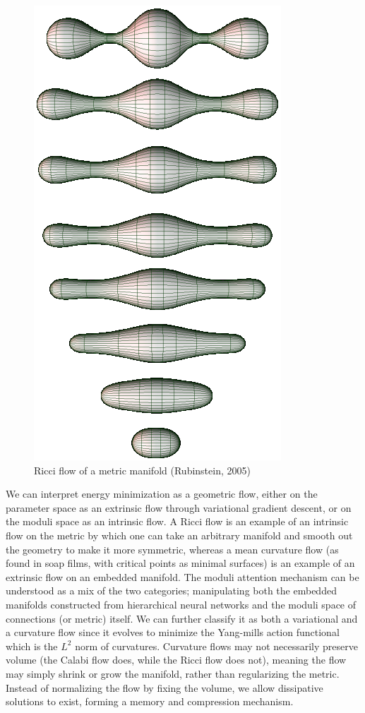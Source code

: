 \documentclass{article}
\begin{document}
    \begin{figure}
        \vspace{0.3cm}
        \centering
        \includegraphics[scale=0.3]{ricci-flow.png}
        \\ Ricci flow of a metric manifold (Rubinstein, 2005)
    \end{figure}
    
    We can interpret energy minimization as a geometric flow, either on the parameter space as an extrinsic flow through variational gradient descent, or on the moduli space as an intrinsic flow. A Ricci flow is an example of an intrinsic flow on the metric by which one can take an arbitrary manifold and smooth out the geometry to make it more symmetric, whereas a mean curvature flow (as found in soap films, with critical points as minimal surfaces) is an example of an extrinsic flow on an embedded manifold. The moduli attention mechanism can be understood as a mix of the two categories; manipulating both the embedded manifolds constructed from hierarchical neural networks and the moduli space of connections (or metric) itself. We can further classify it as both a variational and a curvature flow since it evolves to minimize the Yang-mills action functional which is the $L^2$ norm of curvatures. 
    Curvature flows may not necessarily preserve volume (the Calabi flow does, while the Ricci flow does not), meaning the flow may simply shrink or grow the manifold, rather than regularizing the metric. Instead of normalizing the flow by fixing the volume, we allow dissipative solutions to exist, forming a memory and compression mechanism. 
\end{document}
